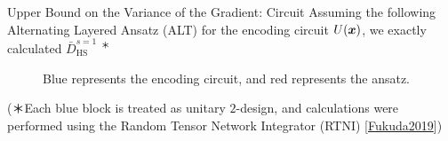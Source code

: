 \documentclass[dvipdfmx,10pt,aspectratio=169]{beamer}
\begin{document}
\newcommand{\bgbs}[1]{\gate[wires=2,style={fill=cyan!50}][1cm][0.1cm]{}\slice{#1}}
\newcommand{\bgb}{\gate[wires=2,style={fill=cyan!50}][1cm][0.1cm]{}}
\newcommand{\agb}{\gate[wires=1,style={fill=red!50}][1cm][0.5cm]{}}
\begin{frame}{Upper Bound on the Variance of the Gradient: Circuit}
    Assuming the following Alternating Layered Ansatz (ALT) for the encoding circuit $U(\vb*{x})$, we exactly calculated $\bar{D}_{\mathrm{HS}}^{s=1}$ ${}^\text{＊}$
    \begin{figure}[H]
        \centering
        \caption{Blue represents the encoding circuit, and red represents the ansatz.}
        \label{fig:alt-tpa-structure}
    \end{figure}

    \begin{scriptsize}
        (＊Each blue block is treated as unitary $2$-design, and calculations were performed using the Random Tensor Network Integrator (RTNI) [\href{http://arxiv.org/abs/1902.08539}{Fukuda2019}])
    \end{scriptsize}
\end{frame}
\end{document}
